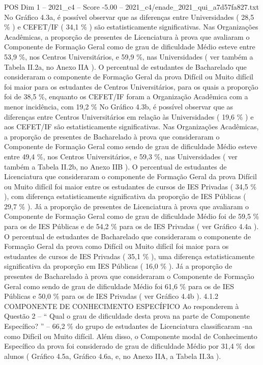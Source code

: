 \begin{textsample}{POS Dim 1 – 2021\_c4 – Score -5.00 – 2021\_c4/enade\_2021\_qui\_a7d57fa827.txt}
No Gráfico 4.3a, é possível observar que as diferenças entre Universidades ( 28,5 \% ) e CEFET/IF ( 34,1 \% ) são estatisticamente significativas.
Nas Organizações Acadêmicas, a proporção de presentes de Licenciatura à prova que avaliaram o Componente de Formação Geral como de grau de dificuldade Médio esteve entre 53,9 \%, nos Centros Universitários, e 59,9 \%, nas Universidades ( ver também a Tabela II.2a, no Anexo IIA ).
O percentual de estudantes de Bacharelado que consideraram o componente de Formação Geral da prova Difícil ou Muito difícil foi maior para os estudantes de Centros Universitários, para os quais a proporção foi de 38,5 \%, enquanto os CEFET/IF foram a Organização Acadêmica com a menor incidência, com 19,2 \% No Gráfico 4.3b, é possível observar que as diferenças entre Centros Universitários em relação às Universidades ( 19,6 \% ) e aos CEFET/IF são estatisticamente significativas.
Nas Organizações Acadêmicas, a proporção de presentes de Bacharelado à prova que consideraram o Componente de Formação Geral como sendo de grau de dificuldade Médio esteve entre 49,4 \%, nos Centros Universitários, e 59,3 \%, nas Universidades ( ver também a Tabela II.2b, no Anexo IIB ).
O percentual de estudantes de Licenciatura que consideraram o componente de Formação Geral da prova Difícil ou Muito difícil foi maior entre os estudantes de cursos de IES Privadas ( 34,5 \% ), com diferença estatisticamente significativa da proporção de IES Públicas ( 29,7 \% ).
Já a proporção de presentes de Licenciatura à prova que avaliaram o Componente de Formação Geral como de grau de dificuldade Médio foi de 59,5 \% para os de IES Públicas e de 54,2 \% para os de IES Privadas ( ver Gráfico 4.4a ).
O percentual de estudantes de Bacharelado que consideraram o componente de Formação Geral da prova como Difícil ou Muito difícil foi maior para os estudantes de cursos de IES Privadas ( 35,1 \% ), uma diferença estatisticamente significativa da proporção em IES Públicas ( 16,0 \% ).
Já a proporção de presentes de Bacharelado à prova que consideraram o Componente de Formação Geral como sendo de grau de dificuldade Médio foi 61,6 \% para os de IES Públicas e 50,0 \% para os de IES Privadas ( ver Gráfico 4.4b ). 4.1.2 COMPONENTE DE CONHECIMENTO ESPECÍFICO Ao responderem à Questão 2 – “ Qual o grau de dificuldade desta prova na parte de Componente Específico? ” – 66,2 \% do grupo de estudantes de Licenciatura classificaram -na como Difícil ou Muito difícil.
Além disso, o Componente modal de Conhecimento Específico da prova foi considerado de grau de dificuldade Médio por 31,4 \% dos alunos ( Gráfico 4.5a, Gráfico 4.6a, e, no Anexo IIA, a Tabela II.3a ).

\end{textsample}

